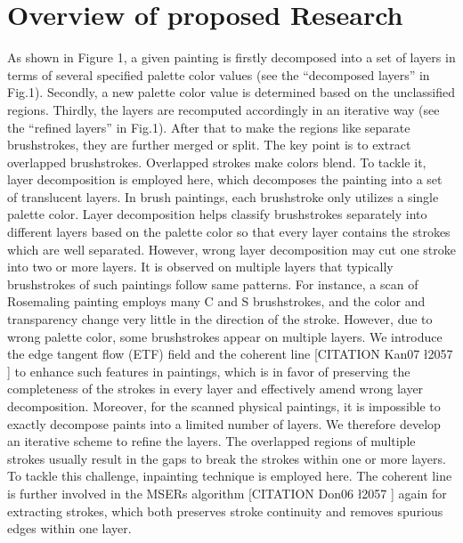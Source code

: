 
\section{Overview of proposed Research}
As shown in Figure 1, a given painting is firstly decomposed into a set of layers in terms of several specified palette color values (see the “decomposed layers” in Fig.1). Secondly, a new palette color value is determined based on the unclassified regions. Thirdly, the layers are recomputed accordingly in an iterative way (see the “refined layers” in Fig.1). After that to make the regions like separate brushstrokes, they are further merged or split.
The key point is to extract overlapped brushstrokes. Overlapped strokes make colors blend. To tackle it, layer decomposition is employed here, which decomposes the painting into a set of translucent layers. In brush paintings, each brushstroke only utilizes a single palette color. Layer decomposition helps classify brushstrokes separately into different layers based on the palette color so that every layer contains the strokes which are well separated.
However, wrong layer decomposition may cut one stroke into two or more layers. It is observed on multiple layers that typically brushstrokes of such paintings follow same patterns. For instance, a scan of Rosemaling painting employs many C and S brushstrokes, and the color and transparency change very little in the direction of the stroke. However, due to wrong palette color, some brushstrokes appear on multiple layers. We introduce the edge tangent flow (ETF) field and the coherent line [CITATION Kan07 \l 2057 ] to enhance such features in paintings, which is in favor of preserving the completeness of the strokes in every layer and effectively amend wrong layer decomposition.
Moreover, for the scanned physical paintings, it is impossible to exactly decompose paints into a limited number of layers. We therefore develop an iterative scheme to refine the layers.
The overlapped regions of multiple strokes usually result in the gaps to break the strokes within one or more layers. To tackle this challenge, inpainting technique is employed here.
The coherent line is further involved in the MSERs algorithm [CITATION Don06 \l 2057 ] again for extracting strokes, which both preserves stroke continuity and removes spurious edges within one layer.